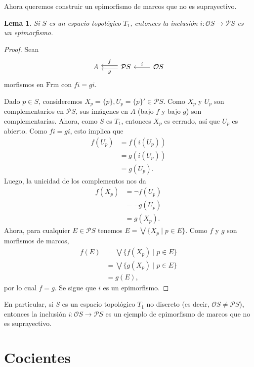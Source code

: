 \documentclass[12pt,letterpaper,titlepage]{article}
\newtheorem{lemma}{Lema}
\theoremstyle{definition}
\newcommand\Sup{\bigvee}
\renewcommand\cal[1]{\mathcal{#1}}
\newcommand\<{\langle}
\renewcommand\>{\rangle}
\newcommand{\Frm}{\mathrm{Frm}}
\begin{document}
Ahora queremos construir un epimorfismo de marcos que no es
suprayectivo.
\begin{lemma}
    Si $S$ es un espacio topológico $T_1$, entonces
    la inclusión $i:\cal OS\to\cal PS$ es un epimorfismo.
\end{lemma}
\begin{proof}
    Sean
    \[
        \begin{tikzcd}
            A
            & \cal PS \ar[l,"f"',shift right] \ar[l,"g",shift left]
            & \cal OS \ar[l,"i"']
        \end{tikzcd}
    \]
    morfismos en $\Frm$ con $fi=gi$.
    
    Dado $p\in S$, consideremos $X_p=\{p\},U_p=\{p\}'\in\cal PS$.
    Como $X_p$ y $U_p$ son complementarios en $\cal PS$,
    sus imágenes en $A$ (bajo $f$ y bajo $g$) son complementarias.
    Ahora, como $S$ es $T_1$, entonces $X_p$ es cerrado, así que
    $U_p$ es abierto.
    Como $fi=gi$, esto implica que
    \begin{align*}
        f(U_p)
        &= f(i(U_p)) \\
        &= g(i(U_p)) \\
        &= g(U_p).
    \end{align*}
    Luego, la unicidad de los complementos nos da
    \begin{align*}
        f(X_p)
        &= \neg f(U_p) \\
        &= \neg g(U_p) \\
        &= g(X_p).
    \end{align*}
    Ahora, para cualquier $E\in\cal PS$ tenemos
    $E=\Sup\{X_p\mid p\in E\}$.
    Como $f$ y $g$ son morfismos de marcos,
    \begin{align*}
        f(E)
        &= \Sup\{f(X_p) \mid p\in E\} \\
        &= \Sup\{g(X_p) \mid p\in E\} \\
        &= g(E),
    \end{align*}
    por lo cual $f=g$.
    Se sigue que $i$ es un epimorfismo.
\end{proof}
En particular, si $S$ es un espacio topológico $T_1$ no discreto
(es decir, $\cal OS\neq\cal PS$), entonces la inclusión
$i:\cal OS\to\cal PS$ es un ejemplo de epimorfismo de marcos que no es
suprayectivo.

\section{Cocientes}
\end{document}
